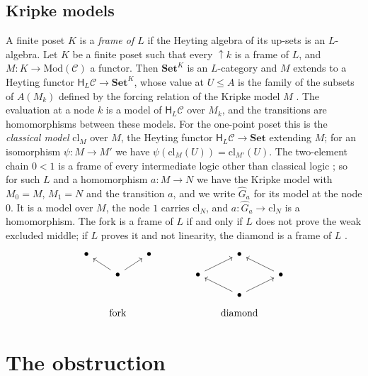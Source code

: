 \documentclass[11pt]{amsart}
\theoremstyle{definition}
\newcommand{\Set}{\mathbf{Set}}
\newcommand{\Mod}{\mathrm{Mod}}
\newcommand{\HH}{\mathsf H}
\newcommand{\cC}{\mathcal C}
\newcommand{\cl}{\mathrm{cl}}
\begin{document}
\subsection*{Kripke models}
A finite poset $K$ is a \emph{frame of $L$} if the Heyting algebra of
its up-sets is an $L$-algebra. Let $K$ be a finite poset such that
every $\uparrow\!k$ is a frame of $L$, and $M\colon K\to\Mod(\cC)$ a
functor. Then $\Set^K$ is an $L$-category and $M$ extends to a Heyting
functor $\HH_L\cC\to\Set^K$, whose value at $U\le A$ is the family of
the subsets of $A(M_k)$ defined by the forcing relation of the Kripke
model $M$ \cite[Lemma~2.3]{Interm}. The evaluation at a node $k$ is a
model of $\HH_L\cC$ over $M_k$, and the transitions are homomorphisms
between these models. For the one-point poset this is the
\emph{classical model} $\cl_M$ over $M$, the Heyting functor
$\HH_L\cC\to\Set$ extending $M$; for an isomorphism $\psi\colon M\to
M'$ we have $\psi(\cl_M(U))=\cl_{M'}(U)$. The two-element chain
$0<1$ is a frame of every intermediate logic other than classical
logic \cite[Lemma~7.1]{Interm}; so for such $L$ and a homomorphism
$a\colon M\to N$ we have the Kripke model with $M_0=M$, $M_1=N$ and
the transition $a$, and we write $\hat G_a$ for its model at the node
$0$. It is a model over $M$, the node $1$ carries $\cl_N$, and
$a\colon\hat G_a\to\cl_N$ is a homomorphism. The fork is a frame of
$L$ if and only if $L$ does not prove the weak excluded middle; if $L$
proves it and not linearity, the diamond is a frame of $L$
\cite[Lemma~3.1]{Interm}.
\[
\begin{tikzcd}[column sep=small,row sep=small]
\bullet&&\bullet&&&&\bullet&\\
&\bullet\ar[ul]\ar[ur]&&&&\bullet\ar[ur]&&\bullet\ar[ul]\\
&&&&&&\bullet\ar[ul]\ar[ur]&\\[-1ex]
&\text{fork}&&&&&\text{diamond}&
\end{tikzcd}
\]

\section{The obstruction}
\end{document}
